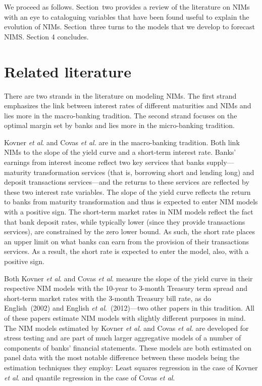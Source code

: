 \documentclass[11pt]{article}
\begin{document}
We proceed as follows. Section~two provides a review of the literature on NIMs with an eye to cataloguing variables that have been found useful to explain the evolution of NIMs. Section~three turns to the models that we develop to forecast NIMS. Section 4 concludes.

\section{Related literature}

\vspace{-0.1in}
There are two strands in the literature on modeling NIMs.  The first strand emphasizes the link between interest rates of different maturities and NIMs and lies more in the macro-banking tradition.  The second strand focuses on the optimal margin set by banks and lies more in the micro-banking tradition.
 
Kovner \textit{et al}. and Covas \textit{et al.} are in the macro-banking tradition. Both link NIMs to the slope of the yield curve and a short-term interest rate.  Banks' earnings from interest income reflect two key services that banks supply---maturity transformation services (that is, borrowing short and lending long) and deposit transactions services---and the returns to these services are reflected by these two interest rate variables.  The slope of the yield curve reflects the return to banks from maturity transformation and thus is expected to enter NIM models with a positive sign. The short-term market rates in NIM models reflect the fact that bank deposit rates, while typically lower (since they provide transactions services), are constrained by the zero lower bound.  As such, the short rate places an upper limit on what banks can earn from the provision of their transactions services. As a result, the short rate is expected to enter the model, also, with a positive sign.

Both Kovner \textit{et al}. and Covas \textit{et al}. measure the slope of the yield curve in their respective NIM models with the 10-year to 3-month Treasury term spread and short-term market rates with the 3-month Treasury bill rate, as do English~(2002) and English \textit{et al}.~(2012)---two other papers in this tradition.  All of these papers estimate NIM models with slightly different purposes in mind.  The NIM models estimated by Kovner \textit{et al}. and Covas \textit{et al}. are developed for stress testing and are part of much larger aggregative models of a number of components of banks' financial statements. These models are both estimated on panel data with the most notable difference between these models being the estimation techniques they employ: Least squares regression in the case of Kovner \textit{et al}. and quantile regression in the case of Covas \textit{et al}.
\end{document}
